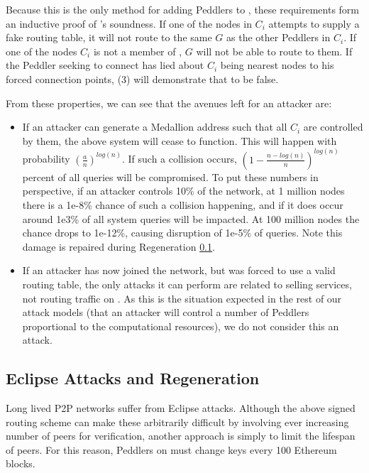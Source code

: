Because this is the only method for adding Peddlers to \tOM{}, these requirements form an inductive proof of \tOM{}'s soundness. If one of the nodes in $C_i$ attempts to supply a fake routing table, it will not route to the same $G$ as the other Peddlers in $C_i$. If one of the nodes $C_i$ is not a member of \tOM{}, $G$ will not be able to route to them. If the Peddler seeking to connect has lied about $C_i$ being nearest nodes to his forced connection points, (3) will demonstrate that to be false.

From these properties, we can see that the avenues left for an attacker are:

\begin{itemize}
\item If an attacker can generate a Medallion address such that all $C_i$ are controlled by them, the above system will cease to function. This will happen with probability $(\frac{a}{n})^{log(n)}$. If such a collision occurs, $(1 - \frac{n-log(n)}{n})^{log(n)}$ percent of all queries will be compromised. To put these numbers in perspective, if an attacker controls 10\% of the network, at 1 million nodes there is a 1e-8\% chance of such a collision happening, and if it does occur around 1e3\% of all system queries will be impacted. At 100 million nodes the chance drops to 1e-12\%, causing disruption of 1e-5\% of queries. Note this damage is repaired during Regeneration \ref{market-regen}.
\item If an attacker has now joined the network, but was forced to use a valid routing table, the only attacks it can perform are related to selling services, not routing traffic on \tOM{}. As this is the situation expected in the rest of our attack models (that an attacker will control a number of Peddlers proportional to the computational resources), we do not consider this an attack.
\end{itemize}

\subsection{Eclipse Attacks and Regeneration}
\label{market-regen}

Long lived P2P networks suffer from Eclipse attacks. Although the
above signed routing scheme can make these arbitrarily difficult by
involving ever increasing number of peers for verification, another
approach is simply to limit the lifespan of peers. For this reason,
Peddlers on \tOM{} must change keys every 100 Ethereum blocks.

